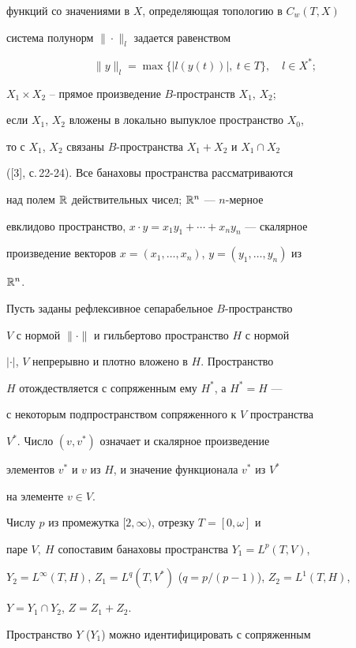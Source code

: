 функций со значениями в $X$, определяющая топологию в $C_w(T,X)$ 


система полунорм $\|\cdot\|_l$ задается равенством 


$$ 


\|y\|_l=\max\{|l(y(t))|,\ t\in T\},\quad l\in X^*; 


$$ 


$X_1\times X_2$ -- прямое произведение $B$-пространств $X_1$, $X_2$; 


если $X_1$, $X_2$ вложены в локально выпуклое пространство $X_0$, 


то с $X_1$, $X_2$ связаны $B$-пространства $X_1+X_2$ и $X_1\cap X_2$ 


([3], с.\,22-24). Все банаховы пространства рассматриваются 


над полем $\Bbb R$ действительных чисел; $\Bbb R^n$ --- $n$-мерное 


евклидово пространство, $x\cdot y=x_1y_1+\dotsb+x_n y_n$ --- скалярное 


произведение векторов $x=(x_1,\dotsc,x_n)$, $y=(y_1,\dotsc,y_n)$ из 


$\Bbb R^n$. 


 


Пусть заданы рефлексивное сепарабельное $B$-пространство 


$V$ с нормой $\|\cdot\|$ и гильбертово пространство $H$ с нормой 


$|\cdot|$, $V$ непрерывно и плотно вложено в $H$. Пространство 


$H$ отождествляется с сопряженным ему $H^*$, а $H^*=H$ --- 


с некоторым подпространством сопряженного к $V$ пространства 


$V^*$. Число $(v,v^*)$ означает и скалярное произведение 


элементов $v^*$ и $v$ из $H$, и значение функционала $v^*$ из $V^*$ 


на элементе $v\in V$. 


 


Числу $p$ из промежутка $[2,\infty)$, отрезку $T=[0,\omega]$ и 


паре $V,\ H$ сопоставим банаховы пространства $Y_1=L^p(T,V)$, 


$Y_2=L^\infty(T,H)$, $Z_1=L^q(T,V^*)$ ($q=p/(p-1)$), $Z_2=L^1(T,H)$, 


$Y=Y_1\cap Y_2$, $Z=Z_1+Z_2$. 


Пространство $Y$ ($Y_1$) можно идентифицировать с сопряженным 


